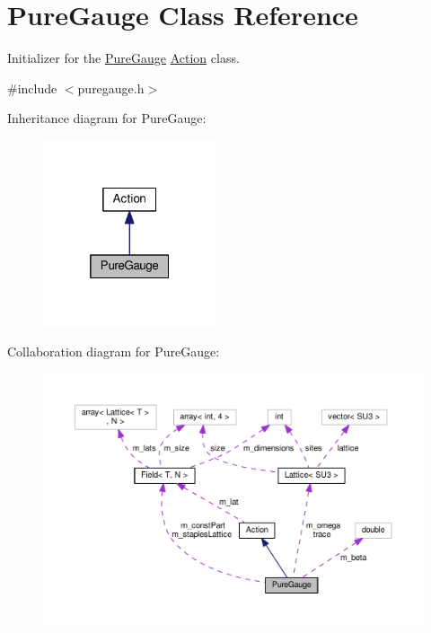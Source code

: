\hypertarget{classPureGauge}{}\section{Pure\+Gauge Class Reference}
\label{classPureGauge}


Initializer for the \hyperlink{classPureGauge}{Pure\+Gauge} \hyperlink{classAction}{Action} class.  




{\ttfamily \#include $<$puregauge.\+h$>$}



Inheritance diagram for Pure\+Gauge\+:
\nopagebreak
\begin{figure}[H]
\begin{center}
\leavevmode
\includegraphics[width=145pt]{d8/da5/classPureGauge__inherit__graph}
\end{center}
\end{figure}


Collaboration diagram for Pure\+Gauge\+:
\nopagebreak
\begin{figure}[H]
\begin{center}
\leavevmode
\includegraphics[width=350pt]{da/d42/classPureGauge__coll__graph}
\end{center}
\end{figure}
